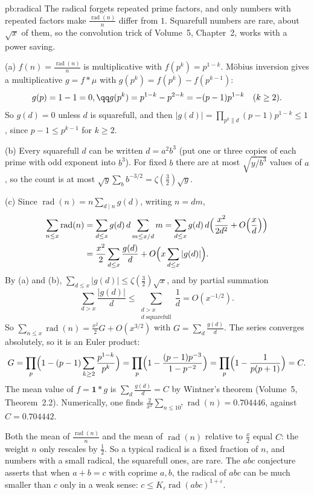 \begin{solution}{pb:radical}
\idea The radical forgets repeated prime factors, and only numbers with repeated factors make $\frac{\operatorname{rad}(n)}n$ differ from $1$. Squarefull numbers are rare,
about $\sqrt x$ of them, so the convolution trick of Volume~5, Chapter~2, works with a power saving.

\writeup (a) $f(n)=\frac{\operatorname{rad}(n)}n$ is multiplicative with $f(p^k)=p^{1-k}$. Möbius inversion gives a multiplicative $g=f*\mu$ with $g(p^k)=f(p^k)-f(p^{k-1})$:
\[
g(p)=1-1=0,\qq g(p^k)=p^{1-k}-p^{2-k}=-(p-1)p^{1-k}\quad(k\ge2).
\]
So $g(d)=0$ unless $d$ is squarefull, and then $|g(d)|=\prod_{p^k\parallel d}(p-1)p^{1-k}\le1$, since $p-1\le p^{k-1}$ for $k\ge2$.

(b) Every squarefull $d$ can be written $d=a^2b^3$ (put one or three copies of each prime with odd exponent into $b^3$). For fixed $b$ there are at most $\sqrt{y/b^3}$ values of
$a$, so the count is at most $\sqrt y\sum_bb^{-3/2}=\zeta(\frac32)\sqrt y$.

(c) Since $\operatorname{rad}(n)=n\sum_{d\mid n}g(d)$, writing $n=dm$,
\[
\begin{aligned}\sum_{n\le x}\operatorname{rad}(n)&=\sum_{d\le x}g(d)\,d\sum_{m\le x/d}m=\sum_{d\le x}g(d)\,d\Bigl(\frac{x^2}{2d^2}+O\Bigl(\frac xd\Bigr)\Bigr)\\&=\frac{x^2}2\sum_{d\le x}\frac{g(d)}d+O\Bigl(x\sum_{d\le x}|g(d)|\Bigr).\end{aligned}
\]
By (a) and (b), $\sum_{d\le x}|g(d)|\le\zeta(\frac32)\sqrt x$, and by partial summation
\[
\sum_{d>x}\frac{|g(d)|}d\le\sum_{\substack{d>x\\ d\text{ squarefull}}}\frac1d=O(x^{-1/2}).
\]
So
$\sum_{n\le x}\operatorname{rad}(n)=\frac{x^2}2G+O(x^{3/2})$ with $G=\sum_d\frac{g(d)}d$. The series converges absolutely, so it is an Euler product:
\[
G=\prod_p\Bigl(1-(p-1)\sum_{k\ge2}\frac{p^{1-k}}{p^k}\Bigr)=\prod_p\Bigl(1-\frac{(p-1)p^{-3}}{1-p^{-2}}\Bigr)=\prod_p\Bigl(1-\frac1{p(p+1)}\Bigr)=C.
\]
The mean value of $f=\mathbf1*g$ is $\sum_d\frac{g(d)}d=C$ by Wintner's theorem (Volume~5, Theorem~2.2). Numerically, one finds $\frac2{x^2}\sum_{n\le10^7}\operatorname{rad}(n)=0.704446$, against $C=0.704442$.

\leads Both the mean of $\frac{\operatorname{rad}(n)}n$ and the mean of $\operatorname{rad}(n)$ relative to $\frac x2$ equal $C$: the weight $n$ only rescales by $\frac12$. So a typical radical
is a fixed fraction of $n$, and numbers with a small radical, the squarefull ones, are rare. The $abc$ conjecture asserts that when $a+b=c$ with coprime $a,b$, the radical
of $abc$ can be much smaller than $c$ only in a weak sense: $c\le K_\varepsilon\operatorname{rad}(abc)^{1+\varepsilon}$.
\end{solution}

